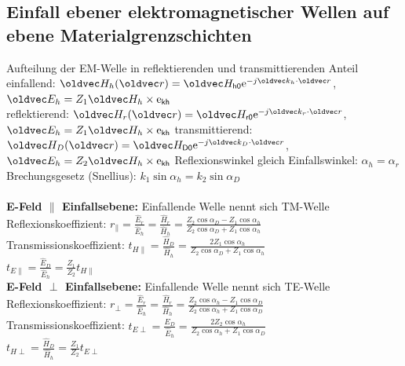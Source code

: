 \documentclass[6pt,a4paper]{scrartcl}
\let\vec\oldvec
\begin{document}
\begin{multicols}{4}
	\subsection{Einfall ebener elektromagnetischer Wellen auf ebene Materialgrenzschichten}
	Aufteilung der EM-Welle in reflektierenden und transmittierenden Anteil\\
	einfallend: $\vec H_h(\vec r) = \vec H_{\ir h0}\e^{-j\vec k_h\cdot\vec r}$, \qquad $\vec E_h = Z_1\vec H_h \times \e_{\ir kh}$\\
	reflektierend: $\vec H_r(\vec r) = \vec H_{\ir r0}\e^{-j\vec k_r\cdot\vec r}$, \qquad $\vec E_h = Z_1\vec H_h \times \e_{\ir kh}$
	transmittierend: $\vec H_D(\vec r) = \vec H_{\ir D0}\e^{-j\vec k_D\cdot\vec r}$, \qquad $\vec E_h = Z_2\vec H_h \times \e_{\ir kh}$
	Reflexionswinkel gleich Einfallswinkel: $\alpha_h = \alpha_r$\\
	Brechungsgesetz (Snellius): $k_1\sin\alpha_h = k_2\sin\alpha_D$\\ \\
	\boxed{
		(\vec H_h + \vec H_r) \times \vec n = \vec H_D \times\vec n \qquad (\vec E_h + \vec E_r)\times n = \vec E_D \times \vec n
	}
	\textbf{E-Feld $\parallel$ Einfallsebene:} Einfallende Welle nennt sich TM-Welle\\
	Reflexionskoeffizient: $r_{\parallel} = \frac{\hat E_r}{\hat E_h} = \frac{\hat H_r}{\hat H_h} = \frac{Z_2\cos\alpha_D - Z_1\cos\alpha_h}{Z_2\cos\alpha_D + Z_1\cos\alpha_h}$\\
	Transmissionskoeffizient: $t_{H\parallel} = \frac{\hat H_D}{\hat H_h} = \frac{2Z_1\cos\alpha_h}{Z_2\cos\alpha_D+Z_1\cos\alpha_h}$\\
	$t_{E\parallel} = \frac{\hat E_D}{\hat E_h} = \frac{Z_1}{Z_2}t_{H\parallel}$\\
	\textbf{E-Feld $\perp$ Einfallsebene:} Einfallende Welle nennt sich TE-Welle\\
	Reflexionskoeffizient: $r_\perp = \frac{\hat E_r}{\hat E_h} = \frac{\hat H_r}{\hat H_h} = \frac{Z_2\cos\alpha_h-Z_1\cos\alpha_D}{Z_2\cos\alpha_h+Z_1\cos\alpha_D}$\\
	Transmissionskoeffizient: $t_{E\perp} = \frac{\hat E_D}{\hat E_h} = \frac{2Z_2\cos\alpha_h}{Z_2\cos\alpha_h+Z_1\cos\alpha_D}$\\
	$t_{H\perp} = \frac{\hat H_D}{\hat H_h} = \frac{Z_1}{Z_2}t_{E\perp}$\\

\end{multicols}
\end{document}
